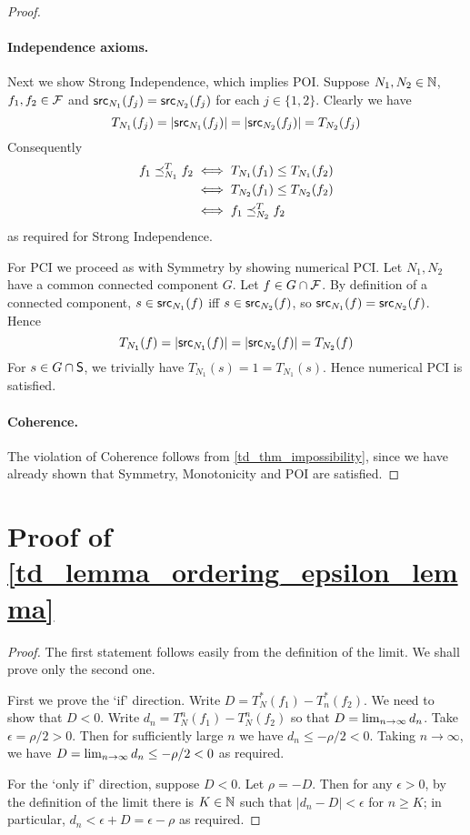 \begin{proof}
\paragraph{Independence axioms.} Next we show Strong Independence, which
implies POI. Suppose $N_1, N_2 \in \N$, $f_1, f_2 \in \F$ and $\src_{N_1}(f_j)
= \src_{N_2}(f_j)$ for each $j \in \{1, 2\}$. Clearly we have
\[
    T_{N_1}(f_j) = |\src_{N_1}(f_j)| = |\src_{N_2}(f_j)| = T_{N_2}(f_j)
\]
Consequently
\begin{align*}
    f_1 \fle_{N_1}^{T} f_2
    & \iff T_{N_1}(f_1) \le T_{N_1}(f_2) \\
    & \iff T_{N_2}(f_1) \le T_{N_2}(f_2) \\
    & \iff f_1 \fle_{N_2}^{T} f_2
\end{align*}
as required for Strong Independence.

For PCI we proceed as with Symmetry by showing numerical PCI. Let $N_1, N_2$
have a common connected component $G$. Let $f \in G \cap \F$. By definition of
a connected component, $s \in \src_{N_1}(f)$ iff $s \in \src_{N_2}(f)$, so
$\src_{N_1}(f) = \src_{N_2}(f)$.
Hence
\[
    T_{N_1}(f)
    = |\src_{N_1}(f)|
    = |\src_{N_2}(f)|
    = T_{N_2}(f)
\]
For $s \in G \cap \S$, we trivially have $T_{N_1}(s) = 1 = T_{N_1}(s)$. Hence
numerical PCI is satisfied.

\paragraph{Coherence.} The violation of Coherence follows from
\cref{td_thm_impossibility}, since we have already shown that Symmetry,
Monotonicity and POI are satisfied.
\end{proof}

\section{Proof of \cref{td_lemma_ordering_epsilon_lemma}}

\begin{proof}
The first statement follows easily from the definition of the limit. We shall
prove only the second one.

First we prove the `if' direction. Write $D = T^*_N(f_1) - T^*_n(f_2)$. We need
to show that $D < 0$. Write $d_n = T_N^n(f_1) - T_N^n(f_2)$ so that $D =
\limn{d_n}$. Take $\epsilon = \rho / 2 > 0$. Then for sufficiently large $n$ we
have $d_n \le -\rho / 2 < 0$. Taking $n \to \infty$, we have $D = \limn{d_n}
\le -\rho / 2 < 0$ as required.

For the `only if' direction, suppose $D < 0$. Let $\rho = -D$. Then for any
$\epsilon > 0$, by the definition of the limit there is $K \in \Nat$ such that
$|d_n - D| < \epsilon$ for $n \ge K$; in particular, $d_n < \epsilon + D =
\epsilon - \rho$ as required.
\end{proof}

